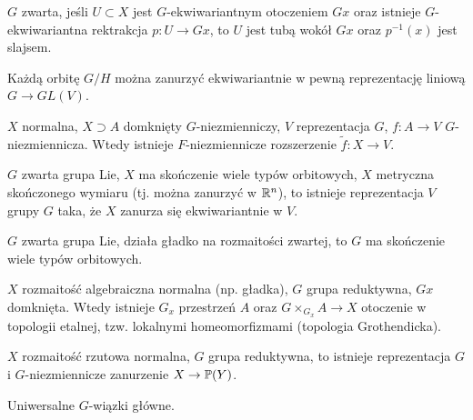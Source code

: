 

 

 \begin{twierdzenie}
  $G$ zwarta, jeśli $U \subset X$ jest $G$-ekwiwariantnym otoczeniem $Gx$ oraz istnieje $G$-ekwiwariantna rektrakcja $p: U \to Gx$, to $U$ jest tubą wokół $Gx$ oraz $p^{-1}(x)$ jest slajsem.
 \end{twierdzenie}
 
 \begin{twierdzeniebd}[Chevalley]
  Każdą orbitę $G/H$ można zanurzyć ekwiwariantnie w pewną reprezentację liniową $G \to GL(V)$.
 \end{twierdzeniebd}
 
 \begin{twierdzeniebd}
  $X$ normalna, $X \supset A$ domknięty $G$-niezmienniczy, $V$ reprezentacja $G$, $f:A \to V$ $G$-niezmiennicza. Wtedy istnieje $F$-niezmiennicze rozszerzenie $\tilde{f}:X \to V$.
 \end{twierdzeniebd}
 
 \begin{twierdzeniebd}[Mostow]
  $G$ zwarta grupa Lie, $X$ ma skończenie wiele typów orbitowych, $X$ metryczna skończonego wymiaru (tj. można zanurzyć w ${\mathbb{R}}^n$), to istnieje reprezentacja $V$ grupy $G$ taka, że $X$ zanurza się ekwiwariantnie w $V$.
 \end{twierdzeniebd}
 
 \begin{twierdzenie}
  $G$ zwarta grupa Lie, działa gładko na rozmaitości zwartej, to $G$ ma skończenie wiele typów orbitowych.
 \end{twierdzenie}
 
 \begin{twierdzeniebd}
  $X$ rozmaitość algebraiczna normalna (np. gładka), $G$ grupa reduktywna, $Gx$ domknięta. Wtedy istnieje $G_x$ przestrzeń $A$ oraz $G \times_{G_x} A \to X$ otoczenie w topologii etalnej, tzw. lokalnymi homeomorfizmami (topologia Grothendicka).
 \end{twierdzeniebd}
 
 \begin{twierdzeniebd}
  $X$ rozmaitość rzutowa normalna, $G$ grupa reduktywna, to istnieje reprezentacja $G$ i $G$-niezmiennicze zanurzenie $X \to {\mathbb{P}}(Y)$.
 \end{twierdzeniebd}
 
 Uniwersalne $G$-wiązki główne.
 
